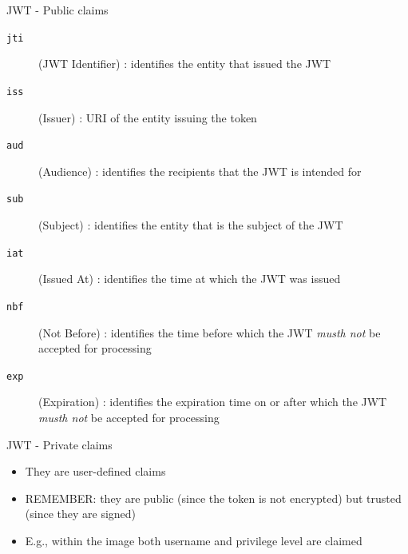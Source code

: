 \begin{frame}[allowframebreaks]
	\begin{block}{JWT - Public claims}
		\begin{description}
			\item[\texttt{jti}] (JWT Identifier) : identifies the entity that issued the JWT
			\item[\texttt{iss}] (Issuer) : URI of the entity issuing the token
			\item[\texttt{aud}] (Audience) : identifies the recipients that the JWT is intended for
			\item[\texttt{sub}] (Subject) : identifies the entity that is the subject of the JWT
			\item[\texttt{iat}] (Issued At) : identifies the time at which the JWT was issued
			\item[\texttt{nbf}] (Not Before) : identifies the time before which the JWT \emph{musth not} be accepted for processing
			\item[\texttt{exp}] (Expiration) : identifies the expiration time on or after which the JWT \emph{musth not} be accepted for processing
		\end{description}
	\end{block}
	
	\begin{block}{JWT - Private claims}
		\begin{itemize}
			\item They are user-defined claims
			\item REMEMBER: they are public (since the token is not encrypted) but trusted (since they are signed)
			\item E.g., within the image both username and privilege level are claimed
		\end{itemize}
	\end{block}
	
\end{frame}

